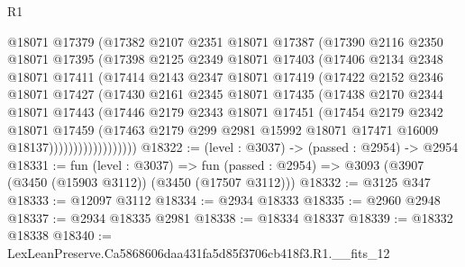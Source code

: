 \begin{lexlean}{R1}
\begin{coremodule}
                  @18071
                  @17379
                  (@17382
                    @2107
                    @2351
                    @18071
                    @17387
                    (@17390
                      @2116
                      @2350
                      @18071
                      @17395
                      (@17398
                        @2125
                        @2349
                        @18071
                        @17403
                        (@17406
                          @2134
                          @2348
                          @18071
                          @17411
                          (@17414
                            @2143
                            @2347
                            @18071
                            @17419
                            (@17422
                              @2152
                              @2346
                              @18071
                              @17427
                              (@17430
                                @2161
                                @2345
                                @18071
                                @17435
                                (@17438
                                  @2170
                                  @2344
                                  @18071
                                  @17443
                                  (@17446
                                    @2179
                                    @2343
                                    @18071
                                    @17451
                                    (@17454
                                      @2179
                                      @2342
                                      @18071
                                      @17459
                                      (@17463
                                        @2179
                                        @299
                                        @2981
                                        @15992
                                        @18071
                                        @17471
                                        @16009
                                        @18137))))))))))))))))))
@18322 := (level : @3037) -> (passed : @2954) -> @2954
@18331 := fun (level : @3037) =>
  fun (passed : @2954) => @3093 (@3907 (@3450 (@15903 @3112)) (@3450 (@17507 @3112)))
@18332 := @3125 @347
@18333 := @12097 @3112
@18334 := @2934 @18333
@18335 := @2960 @2948
@18337 := @2934 @18335 @2981
@18338 := @18334 @18337
@18339 := @18332 @18338
@18340 := LexLeanPreserve.Ca5868606daa431fa5d85f3706cb418f3.R1.__fits_12

\end{coremodule}
\end{lexlean}
